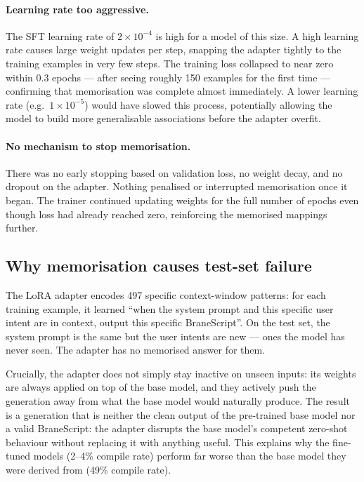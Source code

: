\paragraph{Learning rate too aggressive.}
The SFT learning rate of $2 \times 10^{-4}$ is high for a model of this size.
A high learning rate causes large weight updates per step, snapping the adapter
tightly to the training examples in very few steps. The training loss collapsed
to near zero within 0.3 epochs --- after seeing roughly 150 examples for the
first time --- confirming that memorisation was complete almost immediately.
A lower learning rate (e.g.\ $1 \times 10^{-5}$) would have slowed this
process, potentially allowing the model to build more generalisable
associations before the adapter overfit.

\paragraph{No mechanism to stop memorisation.}
There was no early stopping based on validation loss, no weight decay, and
no dropout on the adapter. Nothing penalised or interrupted memorisation once
it began. The trainer continued updating weights for the full number of epochs
even though loss had already reached zero, reinforcing the memorised mappings
further.

\subsection{Why memorisation causes test-set failure}

The LoRA adapter encodes 497 specific context-window patterns: for each
training example, it learned ``when the system prompt and this specific user
intent are in context, output this specific BraneScript''. On the test set,
the system prompt is the same but the user intents are new --- ones the model
has never seen. The adapter has no memorised answer for them.

Crucially, the adapter does not simply stay inactive on unseen inputs: its
weights are always applied on top of the base model, and they actively push
the generation away from what the base model would naturally produce. The
result is a generation that is neither the clean output of the pre-trained
base model nor a valid BraneScript: the adapter disrupts the base model's
competent zero-shot behaviour without replacing it with anything useful.
This explains why the fine-tuned models (2--4\% compile rate) perform far
worse than the base model they were derived from (49\% compile rate).

